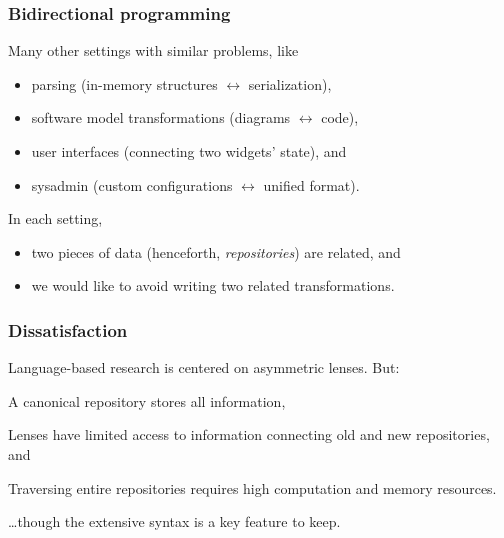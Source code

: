 \documentclass[table]{beamer}
\begin{document}
\begin{frame}
    \frametitle{Bidirectional programming}
    Many other settings with similar problems, like
    \begin{itemize}
        \item parsing (in-memory structures $\leftrightarrow$ serialization),
        \item software model transformations (diagrams $\leftrightarrow$ code),
        \item user interfaces (connecting two widgets' state), and
        \item sysadmin (custom configurations $\leftrightarrow$ unified format).
    \end{itemize}

    In each setting,
    \begin{itemize}
        \item two pieces of data (henceforth, \emph{repositories}) are related, and
        \item we would like to avoid writing two related transformations.
    \end{itemize}
\end{frame}

\begin{frame}
    \frametitle{Dissatisfaction}
    Language-based research is centered on asymmetric lenses. But:

    \begin{description}[Misalignment]
        \item[Asymmetry] A canonical repository stores all information,
        \item[Misalignment] Lenses have limited access to information
            connecting old and new repositories, and
        \item[Performance] Traversing entire repositories requires high
            computation and memory resources.
    \end{description}

    \ldots though the extensive {\color{fg}syntax} is a key feature to keep.
\end{frame}
\end{document}
